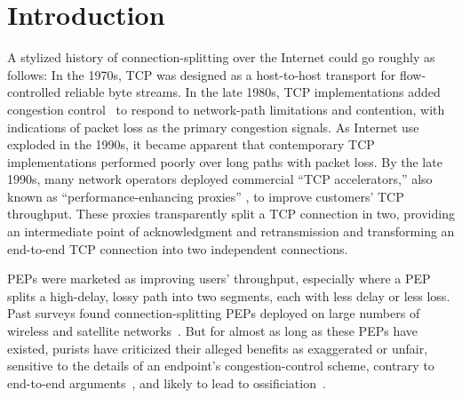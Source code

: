 \section{Introduction}




A stylized history of connection-splitting over the Internet could go
roughly as follows: In the 1970s, TCP was designed as a host-to-host
transport for flow-controlled reliable byte streams. In the late
1980s, TCP implementations added congestion control~\cite{vjk} to
respond to network-path limitations and contention, with indications
of packet loss as the primary congestion signals. As Internet use
exploded in the 1990s, it became apparent that contemporary TCP
implementations performed poorly over long paths with packet loss. By
the late 1990s, many network operators deployed commercial ``TCP
accelerators,'' also known as ``performance-enhancing proxies''
\cite{rfc3135, honda2011still}, to improve customers' TCP
throughput. These proxies transparently split a TCP connection in two,
providing an intermediate point of acknowledgment and retransmission
and transforming an end-to-end TCP connection into two independent
connections.

PEPs were marketed as improving users' throughput, especially where a
PEP splits a high-delay, lossy path into two segments, each with less
delay or less loss. Past surveys found connection-splitting PEPs
deployed on large numbers of wireless and satellite
networks~\cite{rfc3135, honda2011still}. But for almost as long as
these PEPs have existed, purists have criticized their alleged
benefits as exaggerated or unfair, sensitive to the details of an
endpoint's congestion-control scheme, contrary to end-to-end
arguments~\cite{Saltzer84}, and likely to lead to
ossificiation~\cite{papastergiou2017deossifying, edeline2019bottomup}.

